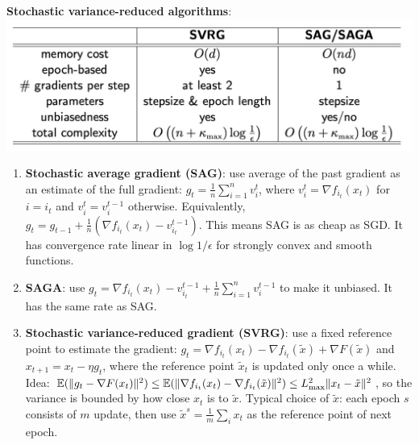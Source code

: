 \textbf{Stochastic variance-reduced algorithms}:
\includegraphics[width=\linewidth]{imgs/SVRG.jpg}
\begin{enumerate}
    \item \textbf{Stochastic average gradient (SAG)}: use average of the past gradient as an estimate of the full gradient: $g_t = \frac{1}{n}\sum_{i=1}^n v_i^t$, where $v_i^t = \nabla f_{i_t}(x_t)$ for $i=i_t$ and $v_i^t=v_i^{t-1}$ otherwise. Equivalently, $g_t = g_{t-1} + \frac{1}{n}(\nabla f_{i_t}(x_t) - v_{i_t}^{t-1})$. This means SAG is as cheap as SGD. It has convergence rate linear in $\log{1/\epsilon}$ for strongly convex and smooth functions.
    \item \textbf{SAGA}: use $g_t = \nabla f_{i_t}(x_t) - v_{i_t}^{t-1} + \frac{1}{n}\sum_{i=1}^n v_i^{t-1}$ to make it unbiased. It has the same rate as SAG.
    \item \textbf{Stochastic variance-reduced gradient (SVRG)}: use a fixed reference point to estimate the gradient: $g_t = \nabla f_{i_t}(x_{t}) - \nabla f_{i_t}(\tilde{x}) + \nabla F(\tilde{x})$ and $x_{t+1} = x_{t} - \eta g_t$, where the reference point $\tilde{x}_t$ is updated only once a while. Idea: $\mathbb{E}(\|g_t - \nabla F(x_t)\|^2) \le \mathbb{E}(\|\nabla f_{i_t}(x_t) - \nabla f_{i_t}(\tilde{x})\|^2) \le L_{\text{max}}^2\|x_t - \tilde{x}\|^2$, so the variance is bounded by how close $x_t$ is to $\tilde{x}$. Typical choice of $\tilde{x}$: each epoch $s$ consists of $m$ update, then use $\tilde{x}^s = \frac{1}{m}\sum_i x_t$ as the reference point of next epoch.
\end{enumerate}

